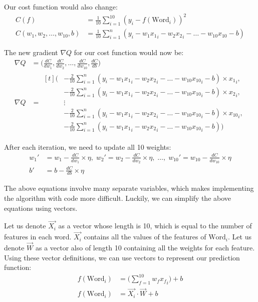 \documentclass[12pt]{article}
\begin{document}
Our cost function would also change:
\begin{align*}
	C(f)                          & = \frac{1}{10} \sum_{i=1}^{10} (y_i - f(\text{Word}_i))^2
	\\
	C(w_1, w_2, \dots, w_{10}, b) & = \frac{1}{10} \sum_{i=1}^{n} (y_i - w_1{x_1}_i - w_2{x_2}_i - \dots - w_{10}{x_{10}} - b)
\end{align*}

The new gradient $\nabla Q$ for our cost function would now be:
\begin{align*}
	\nabla Q & = \Big(\frac{dC}{dw_1}, \frac{dC}{dw_2}, \dots, \frac{dC}{dw_{10}}, \frac{dC}{db}\Big)
	\\
	\nabla Q & =
	\begin{aligned}[t]
		\Big(
		 & -\frac{2}{10} \sum_{i=1}^{n} (y_i - w_1{x_1}_i - w_2{x_2}_i - \dots - w_{10}{x_{10}}_i - b) \times {x_1}_i,
		\\
		 & -\frac{2}{10} \sum_{i=1}^{n} (y_i - w_1{x_1}_i - w_2{x_2}_i - \dots - w_{10}{x_{10}}_i - b) \times {x_2}_i,
		\\
		 & \vdots
		\\
		 & -\frac{2}{10} \sum_{i=1}^{n} (y_i - w_1{x_1}_i - w_2{x_2}_i - \dots - w_{10}{x_{10}}_i - b) \times {x_{10}}_i,
		\\
		 & -\frac{2}{10} \sum_{i=1}^{n} (y_i - w_1{x_1}_i - w_2{x_2}_i - \dots - w_{10}{x_{10}}_i - b)
		\Big)
	\end{aligned}
\end{align*}

After each iteration, we need to update all 10 weights:
\begin{align*}
	w_1' & = w_1 - \frac{dC}{dw_1} \times \eta,
	\;
	w_2' = w_2 - \frac{dC}{dw_2} \times \eta,
	\;
	\dots,
	\;
	w_{10}' = w_{10} - \frac{dC}{dw_{10}} \times \eta
	\\
	b'   & = b - \frac{dC}{db} \times \eta
\end{align*}

The above equations involve many separate variables, which makes implementing the algorithm with code more difficult. Luckily, we can simplify the above equations using vectors.

Let us denote $\vec{X_i}$ as a vector whose length is 10, which is equal to the number of features in each word. $\vec{X_i}$ contains all the values of the features of $\text{Word}_i$. Let us denote $\vec{W}$ as a vector also of length 10 containing all the weights for each feature. Using these vector definitions, we can use vectors to represent our prediction function:
\begin{align*}
	f(\text{Word}_i) & = \Big(\sum_{f=1}^{10} w_f{x_f}_i\Big) + b
	\\
	f(\text{Word}_i) & = \vec{X_i} \cdot \vec{W} + b
\end{align*}
\end{document}
